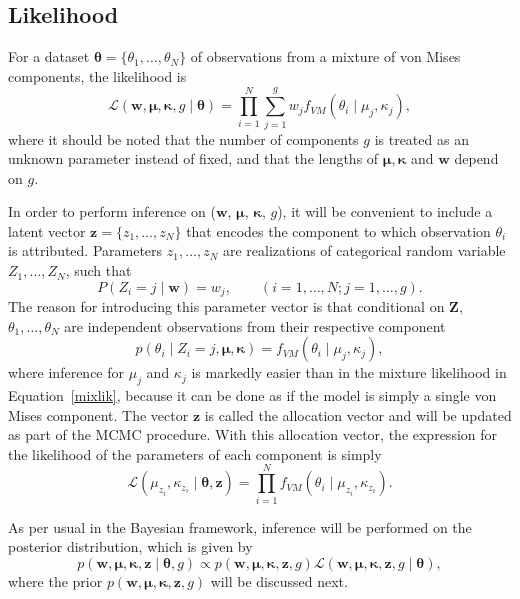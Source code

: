 \subsection{Likelihood}


For a dataset $\bm\theta = \{\theta_1,\dotsc,\theta_N\}$ of observations from a mixture of von Mises components, the likelihood is 
\begin{equation} \label{mixlik}
\mathcal{L}(\bm{w}, \bm\mu, \bm\kappa, g \mid \bm\theta) = \prod_{i=1}^N \sum_{j=1}^g w_j f_{VM}(\theta_i\mid\mu_{j},\kappa_{j}),
\end{equation}
where it should be noted that the number of components $g$ is treated as an unknown parameter instead of fixed, and that the lengths of $\bm\mu, \bm\kappa$ and $\bm{w}$ depend on $g$. 

In order to perform inference on ($\bm w$, $\bm\mu$, $\bm\kappa$, $g$), it will be convenient to include a latent vector $\bm z = \{z_1, \dotsc, z_N\}$ that encodes the component to which observation $\theta_i$ is attributed. Parameters $z_1, \dotsc, z_N$ are realizations of categorical random variable $Z_1, \dotsc, Z_N$, such that
\begin{equation}
P(Z_i = j \mid \bm{w}) = w_j, \qquad (i=1,\dotsc,N; j=1,\dotsc,g).
\end{equation}
The reason for introducing this parameter vector is that conditional on $\bm Z$, $\theta_1, \dotsc, \theta_N$ are independent observations from their respective component
\begin{equation}
p(\theta_i \mid Z_i = j, \bm \mu, \bm \kappa) = f_{VM}(\theta_i \mid \mu_j, \kappa_j),
\end{equation}
where inference for $\mu_j$ and $\kappa_j$ is markedly easier than in the mixture likelihood in Equation~\ref{mixlik}, because it can be done as if the model is simply a single von Mises component. The vector $\bm z$ is called the allocation vector and will be updated as part of the MCMC procedure. With this allocation vector, the expression for the likelihood of the parameters of each component is simply
\begin{equation}
\mathcal{L}(\mu_{z_i},\kappa_{z_i} \mid\bm\theta,\bm{z}) = \prod_{i=1}^N f_{VM}(\theta_i\mid\mu_{z_i},\kappa_{z_i}).
\end{equation}

As per usual in the Bayesian framework, inference will be performed on the posterior distribution, which is given by
\begin{equation} \label{posterior}
p(\bm{w},\bm\mu,\bm\kappa,\bm{z}\mid\bm\theta,g) \propto p(\bm{w},\bm\mu,\bm\kappa,\bm{z},g) \mathcal{L}(\bm{w},\bm\mu,\bm\kappa,\bm{z},g\mid\bm\theta), 
\end{equation}
where the prior $p(\bm{w},\bm\mu,\bm\kappa,\bm{z}, g)$ will be discussed next.  

